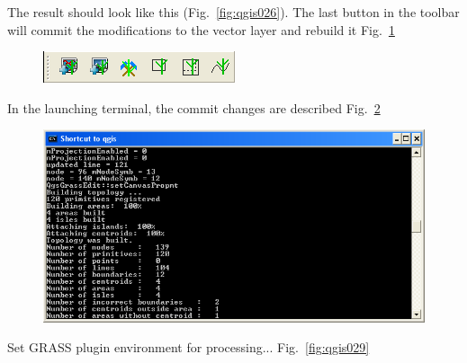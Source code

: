 The result should look like this (Fig.~\ref{fig:qgis026}). The last button in the toolbar will
commit the modifications to the vector layer and rebuild it Fig.~\ref{fig:qgis027}

\begin{figure}[htbp]
   \centering
   \includegraphics[scale=0.75]{qgis027.png}
   \caption{}
   \label{fig:qgis027}
\end{figure}

In the launching terminal, the commit changes are described Fig.~\ref{fig:qgis028}

\begin{figure}[htbp]
   \centering
   \includegraphics[scale=0.35]{qgis028.png}
   \caption{}
   \label{fig:qgis028}
\end{figure}

Set GRASS plugin environment for processing... Fig.~\ref{fig:qgis029}

